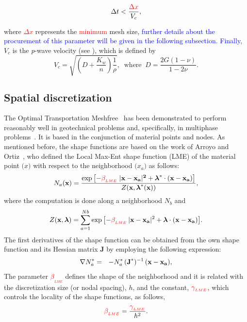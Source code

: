 \documentclass[twocolumn]{svjour3}          %
\begin{document}
\begin{equation}
\label{eq:courant}
\Delta t < \frac{\textcolor{red}{\Delta x}}{V_c},
\end{equation}

where \textcolor{red}{$\Delta x$} represents the \textcolor{red}{minimum} mesh size, \textcolor{blue}{further details about the procurement of this parameter will be given in the following subsection}. \textcolor{blue}{Finally,} $V_c$ is the \textit{p}-wave velocity (see \cite{zienkiewicz1980}), which is defined by  
\begin{equation}
V_c=\sqrt{\left( D+\frac{K_w}{n}\right) \frac{1}{\rho}}, \; \; \textrm{where} \;\; D=\frac{2G(1-\nu)}{1-2\nu}.
\end{equation}\label{ex_2}

\subsection{Spatial discretization}
\label{subsec:41}
The Optimal Transportation Meshfree~\cite{li2010,li2014,Huang2019} has been demonstrated to perform reasonably well in geotechnical problems and, specifically, in multiphase problems~\cite{Navas2020}. It is based in the conjunction of material points and nodes. As mentioned before, the shape functions are based on the work of Arroyo and Ortiz~\cite{arroyo2006}, who defined the Local Max-Ent shape function (LME) of the material point $\boldsymbol(x)$ with respect to the neighborhood $\boldsymbol(x_a)$ as follows:
\begin{equation} \label{eq_N1}
N_a(\textbf{x})=\frac{\exp\left[ -\textcolor{red}{\beta_{_{LME}}} \; |\bf x-x_a|^2 +  \boldsymbol{\lambda}^*  \cdot  (x-x_a)  \right] } {Z(\textbf{x},\boldsymbol{\lambda}^*(\textbf{x}))},
\end{equation}
where the computation is done along a neighborhood $N_b$ and 
\begin{equation}\label{eq_N2}
Z({\bf x}, {\boldsymbol{\lambda}}) = \sum_{a=1}^{Nb}{ \exp \left[ -\textcolor{red}{\beta_{_{LME}}} \, |{\bf x-x_a}|^2 + \boldsymbol{\lambda}  \cdot  \bf {(x-x_a)}         \right]}.
\end{equation}
The first derivatives of the shape function can be obtained from the own shape function and its Hessian matrix \textbf{J} by employing the following expression:
\begin{eqnarray}
\nabla N^*_a &=& -N^*_a \,  (\textbf{J}^*)^{-1} \,  (\bf x-x_a) \label{eq_N3} ,
\end{eqnarray}
The parameter \textcolor{red}{$\beta_{_{LME}}$} defines the shape of the neighborhood and it is related with the discretization size (or nodal spacing), $h$,  and the constant, $\textcolor{red}{\gamma_{_{LME}}}$, which controls the locality of the shape functions, as follows,
\begin{equation}\label{eqLM3}
\textcolor{red}{\beta_{_{LME}}}=\frac{\textcolor{red}{\gamma_{_{LME}}}}{h^2}.
\end{equation} 
\end{document}

